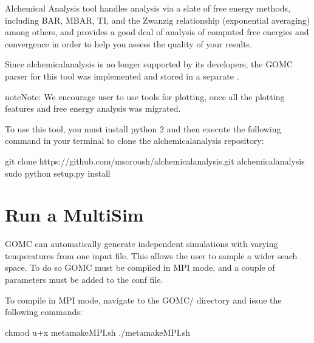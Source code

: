 \documentclass[letterpaper,10pt,english]{sphinxmanual}
\begin{document}
\begin{enumerate}
\sphinxAtStartPar
Alchemical Analysis tool handles analysis via a slate of free energy methods, including BAR,
MBAR, TI, and the Zwanzig relationship (exponential averaging) among others, and provides a good deal
of analysis of computed free energies and convergence in order to help you assess the quality of your results.

\sphinxAtStartPar
Since alchemical\sphinxhyphen{}analysis is no longer supported by its developers, the GOMC parser for this tool
was implemented and stored in a separate .

\begin{sphinxadmonition}{note}{Note:}
\sphinxAtStartPar
We encourage user to use  tools for plotting,
once all the plotting features and free energy analysis was migrated.
\end{sphinxadmonition}

\sphinxAtStartPar
To use this tool, you must install python 2 and then execute the following command in
your terminal to clone the alchemical\sphinxhyphen{}analysis repository:

\begin{sphinxVerbatim}[commandchars=\\\{\}]
\PYGZdl{} git  clone    https://github.com/msoroush/alchemical\PYGZhy{}analysis.git
\PYGZdl{}    alchemical\PYGZhy{}analysis
\PYGZdl{} sudo python setup.py install
\end{sphinxVerbatim}

\end{enumerate}


\section{Run a Multi\sphinxhyphen{}Sim}
\label{\detokenize{howto:run-a-multi-sim}}
\sphinxAtStartPar
GOMC can automatically generate independent simulations with varying temperatures from one input file.
This allows the user to sample a wider seach space.  To do so GOMC must be compiled in MPI mode,
and a couple of parameters must be added to the conf file.

\sphinxAtStartPar
To compile in MPI mode, navigate to the GOMC/ directory and issue the following commands:

\begin{sphinxVerbatim}[commandchars=\\\{\}]
\PYGZdl{} chmod u+x metamakeMPI.sh
\PYGZdl{} ./metamakeMPI.sh
\end{sphinxVerbatim}
\end{document}
